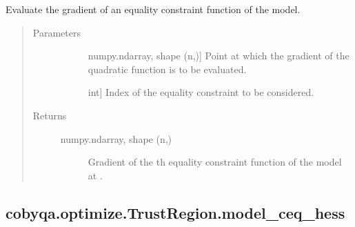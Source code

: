 \documentclass[letterpaper,10pt,english]{sphinxmanual}
\begin{document}
\begin{fulllineitems}
\begin{fulllineitems}
\label{\detokenize{refs/generated/cobyqa.optimize.TrustRegion.model_ceq_grad:cobyqa.optimize.TrustRegion.model_ceq_grad}}
\sphinxAtStartPar
Evaluate the gradient of an equality constraint function of the model.
\begin{quote}\begin{description}
\item[{Parameters}] \leavevmode\begin{description}
\item[{}] \leavevmode{[}numpy.ndarray, shape (n,){]}
\sphinxAtStartPar
Point at which the gradient of the quadratic function is to be
evaluated.

\item[{}] \leavevmode{[}int{]}
\sphinxAtStartPar
Index of the equality constraint to be considered.

\end{description}

\item[{Returns}] \leavevmode\begin{description}
\item[{numpy.ndarray, shape (n,)}] \leavevmode
\sphinxAtStartPar
Gradient of the \sphinxhyphen{}th equality constraint function of the model at
.

\end{description}

\end{description}\end{quote}

\end{fulllineitems}



\subsection{cobyqa.optimize.TrustRegion.model\_ceq\_hess}
\label{\detokenize{refs/generated/cobyqa.optimize.TrustRegion.model_ceq_hess:cobyqa-optimize-trustregion-model-ceq-hess}}\label{\detokenize{refs/generated/cobyqa.optimize.TrustRegion.model_ceq_hess::doc}}


\end{fulllineitems}
\end{document}
